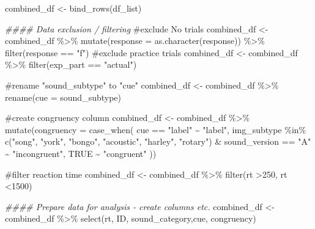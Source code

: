 \documentclass[
  letterpaper,
  DIV=11,
  numbers=noendperiod]{scrartcl}
\newenvironment{Shaded}{\begin{snugshade}}{\end{snugshade}}
\newcommand{\AttributeTok}[1]{\textcolor[rgb]{0.40,0.45,0.13}{#1}}
\newcommand{\CommentTok}[1]{\textcolor[rgb]{0.37,0.37,0.37}{#1}}
\newcommand{\ConstantTok}[1]{\textcolor[rgb]{0.56,0.35,0.01}{#1}}
\newcommand{\DecValTok}[1]{\textcolor[rgb]{0.68,0.00,0.00}{#1}}
\newcommand{\DocumentationTok}[1]{\textcolor[rgb]{0.37,0.37,0.37}{\textit{#1}}}
\newcommand{\FunctionTok}[1]{\textcolor[rgb]{0.28,0.35,0.67}{#1}}
\newcommand{\NormalTok}[1]{\textcolor[rgb]{0.00,0.23,0.31}{#1}}
\newcommand{\OtherTok}[1]{\textcolor[rgb]{0.00,0.23,0.31}{#1}}
\newcommand{\SpecialCharTok}[1]{\textcolor[rgb]{0.37,0.37,0.37}{#1}}
\newcommand{\StringTok}[1]{\textcolor[rgb]{0.13,0.47,0.30}{#1}}
\begin{document}
\begin{Shaded}
\begin{Highlighting}[]
\NormalTok{combined\_df }\OtherTok{\textless{}{-}} \FunctionTok{bind\_rows}\NormalTok{(df\_list)}

\DocumentationTok{\#\#\#\# Data exclusion / filtering}
\CommentTok{\#exclude \textquotesingle{}No\textquotesingle{} trials }
\NormalTok{combined\_df }\OtherTok{\textless{}{-}}\NormalTok{ combined\_df }\SpecialCharTok{\%\textgreater{}\%}
  \FunctionTok{mutate}\NormalTok{(}\AttributeTok{response =} \FunctionTok{as.character}\NormalTok{(response)) }\SpecialCharTok{\%\textgreater{}\%}
  \FunctionTok{filter}\NormalTok{(response }\SpecialCharTok{==} \StringTok{"f"}\NormalTok{)}
\CommentTok{\#exclude practice trials }
\NormalTok{combined\_df }\OtherTok{\textless{}{-}}\NormalTok{ combined\_df }\SpecialCharTok{\%\textgreater{}\%}
  \FunctionTok{filter}\NormalTok{(exp\_part }\SpecialCharTok{==} \StringTok{"actual"}\NormalTok{)}

\CommentTok{\#rename "sound\_subtype" to "cue"}
\NormalTok{combined\_df }\OtherTok{\textless{}{-}}\NormalTok{ combined\_df }\SpecialCharTok{\%\textgreater{}\%}
  \FunctionTok{rename}\NormalTok{(}\AttributeTok{cue =}\NormalTok{ sound\_subtype)}

\CommentTok{\#create congruency column }
\NormalTok{combined\_df }\OtherTok{\textless{}{-}}\NormalTok{ combined\_df }\SpecialCharTok{\%\textgreater{}\%}
  \FunctionTok{mutate}\NormalTok{(}\AttributeTok{congruency =} \FunctionTok{case\_when}\NormalTok{(}
\NormalTok{    cue }\SpecialCharTok{==} \StringTok{"label"} \SpecialCharTok{\textasciitilde{}} \StringTok{"label"}\NormalTok{,}
\NormalTok{    img\_subtype }\SpecialCharTok{\%in\%} \FunctionTok{c}\NormalTok{(}\StringTok{"song"}\NormalTok{, }\StringTok{"york"}\NormalTok{, }\StringTok{"bongo"}\NormalTok{, }\StringTok{"acoustic"}\NormalTok{, }\StringTok{"harley"}\NormalTok{, }\StringTok{"rotary"}\NormalTok{) }\SpecialCharTok{\&}\NormalTok{ sound\_version }\SpecialCharTok{==} \StringTok{"A"} \SpecialCharTok{\textasciitilde{}} \StringTok{"incongruent"}\NormalTok{,}
    \ConstantTok{TRUE} \SpecialCharTok{\textasciitilde{}} \StringTok{"congruent"}
\NormalTok{  ))}


\CommentTok{\#filter reaction time }
\NormalTok{combined\_df }\OtherTok{\textless{}{-}}\NormalTok{ combined\_df }\SpecialCharTok{\%\textgreater{}\%}
  \FunctionTok{filter}\NormalTok{(rt }\SpecialCharTok{\textgreater{}}\DecValTok{250}\NormalTok{, rt }\SpecialCharTok{\textless{}}\DecValTok{1500}\NormalTok{)}

\DocumentationTok{\#\#\#\# Prepare data for analysis {-} create columns etc.}
\NormalTok{combined\_df }\OtherTok{\textless{}{-}}\NormalTok{ combined\_df }\SpecialCharTok{\%\textgreater{}\%}
  \FunctionTok{select}\NormalTok{(rt, ID, sound\_category,cue, congruency)}
\end{Highlighting}
\end{Shaded}
\end{document}
